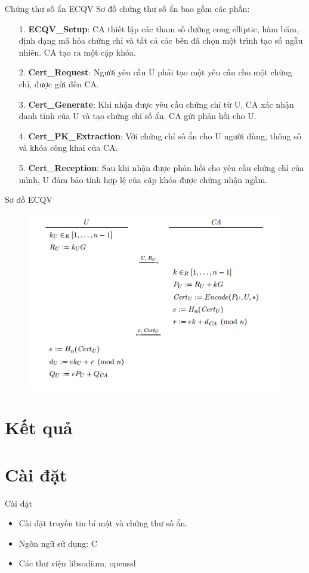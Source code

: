 \documentclass[compress]{beamer}
\begin{document}
\begin{frame}{Chứng thư số ẩn ECQV}
Sơ đồ chứng thư số ẩn bao gồm các phần:
\small{
\begin{itemize}
\item[1. ] \textbf{ECQV\_Setup}: CA thiết lập các tham số đường cong elliptic, hàm băm, định dạng mã hóa chứng chỉ và tất cả các bên đã chọn một trình tạo số ngẫu nhiên. CA tạo ra một cặp khóa.
\item[2. ] \textbf{Cert\_Request}: Người yêu cầu U phải tạo một yêu cầu cho một chứng chỉ, được gửi đến CA.
\item[3. ] \textbf{Cert\_Generate}: Khi nhận được yêu cầu chứng chỉ từ U, CA xác nhận danh tính của U và tạo chứng chỉ số ẩn. CA gửi phản hồi cho U.
\item[4. ] \textbf{Cert\_PK\_Extraction}: Với chứng chỉ số ẩn cho U người dùng, thông số và khóa công khai của CA.
\item[5. ] \textbf{Cert\_Reception}: Sau khi nhận được phản hồi cho yêu cầu chứng chỉ của mình, U đảm bảo tính hợp lệ của cặp khóa được chứng nhận ngầm.
\end{itemize}
}
\end{frame}
\begin{frame}{Sơ đồ ECQV}
\begin{center}
\begin{figure}[h]
\centering
\includegraphics[width=0.85\linewidth]{../im8.png}
\end{figure}
\end{center}
\end{frame}
\section{Kết quả}
\section*{Cài đặt}
\begin{frame}{Cài đặt}
\begin{itemize}
\item Cài đặt truyền tin bí mật và chứng thư số ẩn.
\item Ngôn ngữ sử dụng: C
\item Các thư viện libsodium, openssl
\end{itemize}
\end{frame}
\end{document}
